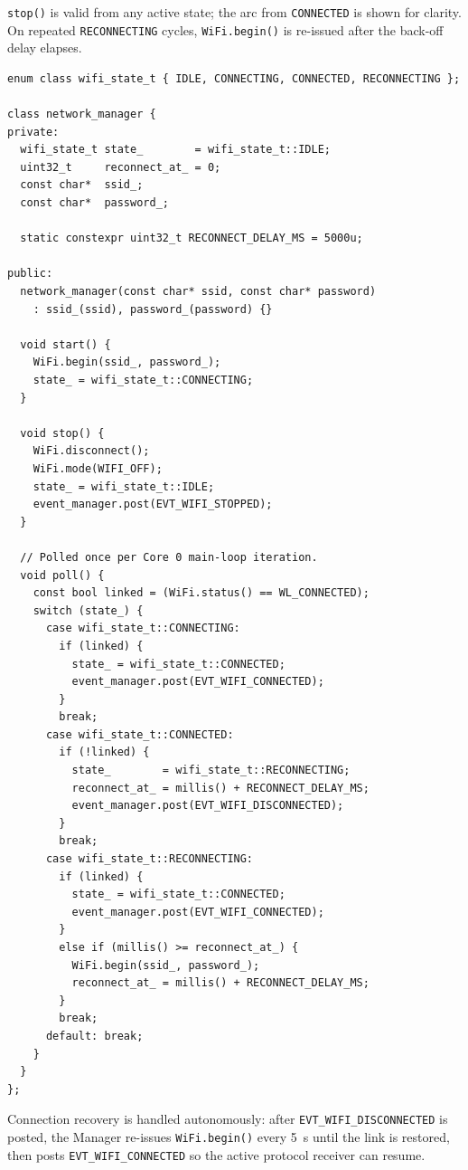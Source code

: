 \texttt{stop()} is valid from any active state; the arc from \texttt{CONNECTED} is shown for clarity.
On repeated \texttt{RECONNECTING} cycles, \texttt{WiFi.begin()} is re-issued after the back-off delay elapses.

\begin{longlisting}
\begin{verbatim}
enum class wifi_state_t { IDLE, CONNECTING, CONNECTED, RECONNECTING };

class network_manager {
private:
  wifi_state_t state_        = wifi_state_t::IDLE;
  uint32_t     reconnect_at_ = 0;
  const char*  ssid_;
  const char*  password_;

  static constexpr uint32_t RECONNECT_DELAY_MS = 5000u;

public:
  network_manager(const char* ssid, const char* password)
    : ssid_(ssid), password_(password) {}

  void start() {
    WiFi.begin(ssid_, password_);
    state_ = wifi_state_t::CONNECTING;
  }

  void stop() {
    WiFi.disconnect();
    WiFi.mode(WIFI_OFF);
    state_ = wifi_state_t::IDLE;
    event_manager.post(EVT_WIFI_STOPPED);
  }

  // Polled once per Core 0 main-loop iteration.
  void poll() {
    const bool linked = (WiFi.status() == WL_CONNECTED);
    switch (state_) {
      case wifi_state_t::CONNECTING:
        if (linked) {
          state_ = wifi_state_t::CONNECTED;
          event_manager.post(EVT_WIFI_CONNECTED);
        }
        break;
      case wifi_state_t::CONNECTED:
        if (!linked) {
          state_        = wifi_state_t::RECONNECTING;
          reconnect_at_ = millis() + RECONNECT_DELAY_MS;
          event_manager.post(EVT_WIFI_DISCONNECTED);
        }
        break;
      case wifi_state_t::RECONNECTING:
        if (linked) {
          state_ = wifi_state_t::CONNECTED;
          event_manager.post(EVT_WIFI_CONNECTED);
        }
        else if (millis() >= reconnect_at_) {
          WiFi.begin(ssid_, password_);
          reconnect_at_ = millis() + RECONNECT_DELAY_MS;
        }
        break;
      default: break;
    }
  }
};
\end{verbatim}
\caption{Network Manager implementation.}
\label{lst:network_manager}
\end{longlisting}

Connection recovery is handled autonomously: after \texttt{EVT\_WIFI\_DISCONNECTED} is posted, the Manager re-issues \texttt{WiFi.begin()} every \SI{5}{\second} until the link is restored, then posts \texttt{EVT\_WIFI\_CONNECTED} so the active protocol receiver can resume.

